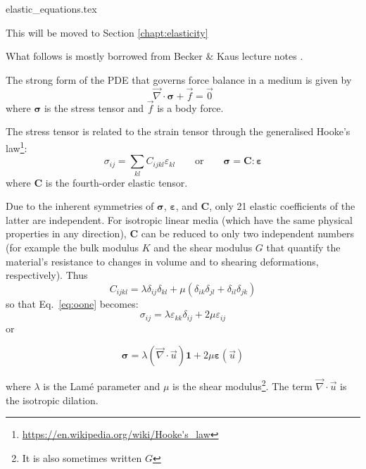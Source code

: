\begin{flushright} {\tiny {\color{gray} elastic\_equations.tex}} \end{flushright}

{\large \color{orange} This will be moved to Section \ref{chapt:elasticity}}

What follows is mostly borrowed from Becker \& Kaus lecture notes \cite{beka}.

The strong form of the PDE that governs force balance in a medium is given by
\[
\vec{\nabla}\cdot{\bm \sigma}  + \vec{f} = \vec{0}
\]
where ${\bm \sigma}$ is the stress tensor and $\vec{f}$ is a body force.

The stress tensor is related to the strain tensor through the generalised 
Hooke's law\footnote{\url{https://en.wikipedia.org/wiki/Hooke's_law}}:
\begin{equation}
\sigma_{ij}=\sum_{kl}C_{ijkl}\varepsilon_{kl} 
\qquad
\text{or}
\qquad
{\bm \sigma} = {\bm C} : {\bm \varepsilon}
\label{eq:oone}
\end{equation}
where ${\bm C}$ is the fourth-order elastic tensor.

Due to the inherent symmetries of ${\bm \sigma}$, ${\bm \varepsilon}$, and ${\bm C}$, 
only 21 elastic coefficients of the latter are independent. 
For isotropic linear media (which have the same physical properties in any direction), ${\bm C}$ 
can be reduced to only two independent numbers (for example the bulk modulus $K$ and the shear modulus $G$ 
that quantify the material's resistance to changes in volume and to shearing deformations, respectively).
Thus
\[
C_{ijkl} = \lambda \delta_{ij}\delta_{kl} + \mu (\delta_{ik}\delta_{jl}+\delta_{il}\delta_{jk})
\]
so that Eq.~\eqref{eq:oone} becomes:
\[
\sigma_{ij}=\lambda \varepsilon_{kk} \delta_{ij} + 2\mu \varepsilon_{ij}
\]
or
\begin{mdframed}[backgroundcolor=blue!5]
\begin{equation}
{\bm \sigma}=\lambda (\vec{\nabla}\cdot\vec{u}) {\bm 1} +2\mu {\bm \varepsilon}(\vec{u}) \label{eq:twoELAST}
\end{equation}
\end{mdframed}
where $\lambda$ is the Lam\'e parameter and $\mu$ is the shear 
modulus\footnote{It is also sometimes written $G$}.
The term $\vec{\nabla}\cdot\vec{u}$ is the isotropic dilation.


